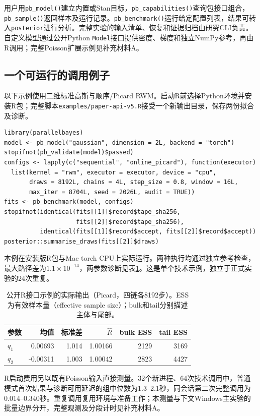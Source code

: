 \documentclass[UTF8,fontset=fandol,zihao=-4]{ctexart}
\begin{document}
用户用\texttt{pb\_model()}建立内置或Stan目标，\texttt{pb\_capabilities()}查询包接口组合，\texttt{pb\_sample()}返回样本及运行记录。\texttt{pb\_benchmark()}运行给定配置列表，结果可转入\texttt{posterior}进行分析\cite{posterior}。完整实验的输入清单、恢复和证据归档由研究CLI负责。自定义模型通过公开Python \texttt{Model}接口提供密度、梯度和独立NumPy参考，再由R调用；完整Poisson扩展示例见补充材料A。

\subsection{一个可运行的调用例子}
以下示例使用二维标准高斯与顺序/Picard RWM。启动R前选择Python环境并安装R包；完整脚本\texttt{examples/paper-api-v5.R}接受一个新输出目录，保存两份拟合及诊断。
\begingroup\small\begin{verbatim}
library(parallelbayes)
model <- pb_model("gaussian", dimension = 2L, backend = "torch")
stopifnot(pb_validate(model)$passed)
configs <- lapply(c("sequential", "online_picard"), function(executor)
  list(kernel = "rwm", executor = executor, device = "cpu",
       draws = 8192L, chains = 4L, step_size = 0.8, window = 16L,
       max_iter = 8704L, seed = 2026L, audit = TRUE))
fits <- pb_benchmark(model, configs)
stopifnot(identical(fits[[1]]$record$tape_sha256,
                    fits[[2]]$record$tape_sha256),
          identical(fits[[1]]$record$accept, fits[[2]]$record$accept))
posterior::summarise_draws(fits[[2]]$draws)
\end{verbatim}\endgroup

本例在安装版R包与Mac torch CPU上实际运行。两种执行均通过独立参考检查，最大路径差为$1.1\times10^{-14}$，两参数诊断见表\ref{tab:r-example}。这是单个技术示例，独立于正式实验的24次重复。
\begin{table}[htbp]\centering\small
\begin{tabular}{lrrrrr}\toprule
参数 & 均值 & 标准差 & $\hat R$ & bulk ESS & tail ESS\\\midrule
$q_1$ & 0.00693 & 1.014 & 1.00166 & 2129 & 3169\\
$q_2$ & -0.00311 & 1.003 & 1.00042 & 2823 & 4427\\\bottomrule
\end{tabular}
\caption{公开R接口示例的实际输出（Picard，四链各8192步）。ESS为有效样本量（effective sample size）；bulk和tail分别描述主体与尾部。}\label{tab:r-example}
\end{table}

R启动费用另以既有Poisson输入直接测量。32个新进程、64次技术调用中，普通模式首次结果与诊断可用延迟的组中位数为1.3--2.1秒，同会话第二次完整调用为0.014--0.340秒。重复调用复用环境与准备工作；本测量与下文Windows主实验的批量边界分开，完整观测及分段计时见补充材料A。
\end{document}
